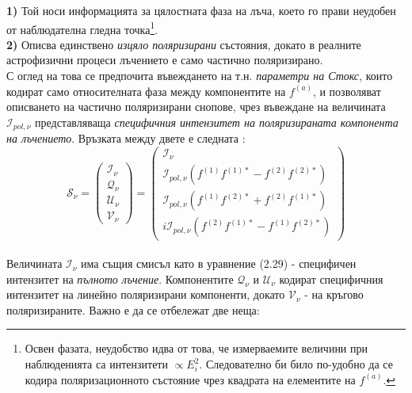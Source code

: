 \noindent\textbf{1)} Той носи информацията за цялостната фаза на лъча, което го прави неудобен от наблюдателна гледна точка\footnote{Освен фазата, неудобство идва от това, че измерваемите величини при наблюденията са интензитети $\propto E_i^2$. Следователно би било по-удобно да се кодира поляризационното състояние чрез квадрата на елементите на $f^{(a)}$.}.\\

\noindent\textbf{2)} Описва единствено \emph{изцяло поляризирани} състояния, докато в реалните астрофизични процеси лъчението е само частично поляризирано.\\

\noindent С оглед на това се предпочита въвеждането на т.н. \emph{параметри на Стокс}, които кодират само относителната фаза между компонентите на $f^{(a)}$, и позволяват описването на частично поляризирани снопове, чрез въвеждане на величината $\mathcal{I}_{pol, \nu}$ представляваща \emph{специфичния интензитет на поляризираната компонента на лъчението}. Връзката между двете е следната \cite{Bronzwaer2020}:\\

\begin{equation}
	\mathcal{S}_\nu = \begin{pmatrix}
					\mathcal{I}_\nu \\
					\mathcal{Q}_\nu \\
					\mathcal{U}_\nu \\
					\mathcal{V}_\nu
				\end{pmatrix} = 
				\begin{pmatrix}
					\mathcal{I}_\nu \\
					\mathcal{I}_{pol, \nu} \left(f^{(1)} f^{(1)*} - f^{(2)} f^{(2)*} \right) \\
					\mathcal{I}_{pol, \nu} \left(f^{(1)} f^{(2)*} + f^{(2)} f^{(1)*} \right) \\
					i\mathcal{I}_{pol, \nu} \left(f^{(2)} f^{(1)*} - f^{(1)} f^{(2)*} \right)	
				\end{pmatrix} 
\end{equation}\\

\noindent Величината $\mathcal{I}_\nu$ има същия смисъл като в уравнение (2.29) - специфичен интензитет на \emph{пълното лъчение}. Компонентите $\mathcal{Q}_\nu$ и $\mathcal{U}_\nu$ кодират специфичния интензитет на линейно поляризирани компоненти, докато $\mathcal{V}_\nu$ - на кръгово поляризираните. Важно е да се отбележат две неща:\\\newline


